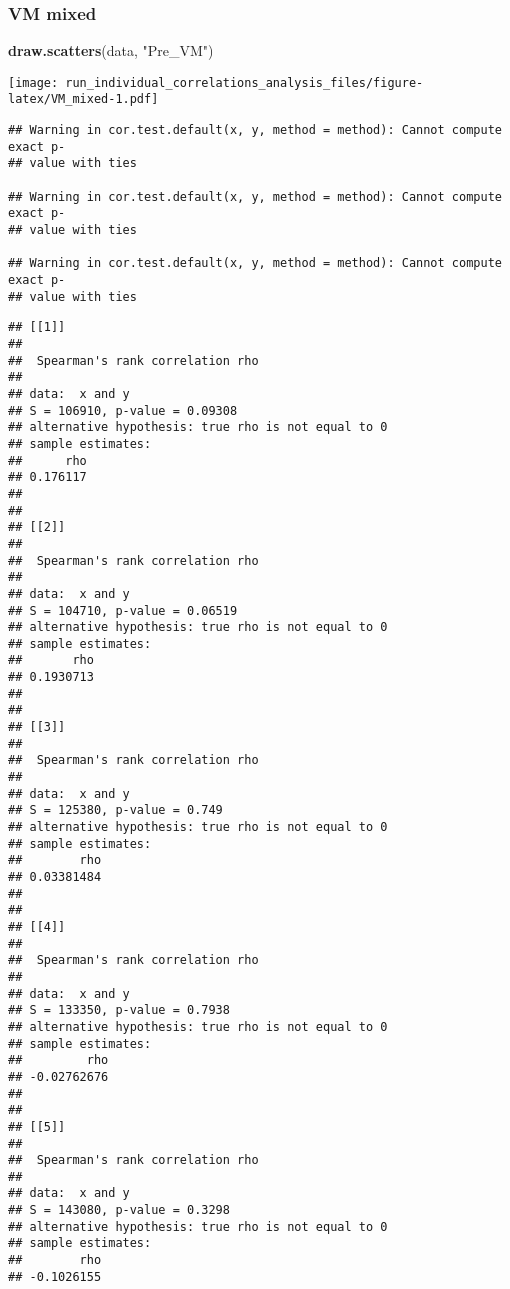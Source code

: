 \documentclass[]{article}
\newenvironment{Shaded}{\begin{snugshade}}{\end{snugshade}}
\newcommand{\KeywordTok}[1]{\textcolor[rgb]{0.13,0.29,0.53}{\textbf{#1}}}
\newcommand{\DataTypeTok}[1]{\textcolor[rgb]{0.13,0.29,0.53}{#1}}
\newcommand{\StringTok}[1]{\textcolor[rgb]{0.31,0.60,0.02}{#1}}
\newcommand{\OperatorTok}[1]{\textcolor[rgb]{0.81,0.36,0.00}{\textbf{#1}}}
\newcommand{\NormalTok}[1]{#1}
\begin{document}
\subsubsection{VM mixed}\label{vm-mixed}

\begin{Shaded}
\begin{Highlighting}[]
\KeywordTok{draw.scatters}\NormalTok{(data, }\StringTok{"Pre_VM"}\NormalTok{)}
\end{Highlighting}
\end{Shaded}

\texttt{[image: run\_individual\_correlations\_analysis\_files/figure-latex/VM\_mixed-1.pdf]}

\begin{Shaded}
\end{Shaded}

\begin{verbatim}
## Warning in cor.test.default(x, y, method = method): Cannot compute exact p-
## value with ties

## Warning in cor.test.default(x, y, method = method): Cannot compute exact p-
## value with ties

## Warning in cor.test.default(x, y, method = method): Cannot compute exact p-
## value with ties
\end{verbatim}

\begin{verbatim}
## [[1]]
## 
##  Spearman's rank correlation rho
## 
## data:  x and y
## S = 106910, p-value = 0.09308
## alternative hypothesis: true rho is not equal to 0
## sample estimates:
##      rho 
## 0.176117 
## 
## 
## [[2]]
## 
##  Spearman's rank correlation rho
## 
## data:  x and y
## S = 104710, p-value = 0.06519
## alternative hypothesis: true rho is not equal to 0
## sample estimates:
##       rho 
## 0.1930713 
## 
## 
## [[3]]
## 
##  Spearman's rank correlation rho
## 
## data:  x and y
## S = 125380, p-value = 0.749
## alternative hypothesis: true rho is not equal to 0
## sample estimates:
##        rho 
## 0.03381484 
## 
## 
## [[4]]
## 
##  Spearman's rank correlation rho
## 
## data:  x and y
## S = 133350, p-value = 0.7938
## alternative hypothesis: true rho is not equal to 0
## sample estimates:
##         rho 
## -0.02762676 
## 
## 
## [[5]]
## 
##  Spearman's rank correlation rho
## 
## data:  x and y
## S = 143080, p-value = 0.3298
## alternative hypothesis: true rho is not equal to 0
## sample estimates:
##        rho 
## -0.1026155
\end{verbatim}
\end{document}
